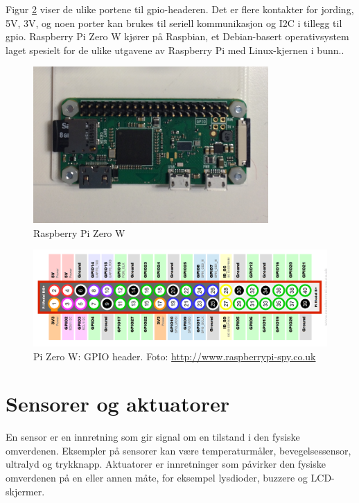Figur \ref{fig:pizero_gpio} viser de ulike portene til \gls{gpio}-headeren. Det er flere kontakter for
jording, 5V, 3V, og noen porter kan brukes til seriell kommunikasjon og I2C i tillegg til \gls{gpio}.
Raspberry Pi Zero W kjører på Raspbian, et Debian-basert operativsystem laget spesielt for de ulike utgavene av
Raspberry Pi med Linux-kjernen i bunn..

\begin{figure}
\includegraphics[width=0.8\textwidth,center]{fig/prototype/pi}
\caption{Raspberry Pi Zero W}
\label{fig:pizero}
\end{figure}

\begin{figure}
\includegraphics[width=1.0\textwidth,center]{fig/pizero_gpio}
\caption{Pi Zero W: GPIO header. Foto: \url{http://www.raspberrypi-spy.co.uk}}
\label{fig:pizero_gpio}
\end{figure}

\section{Sensorer og aktuatorer}
En sensor er en innretning som gir signal om en tilstand i den fysiske omverdenen. Eksempler
på sensorer kan være temperaturmåler, bevegelsessensor, ultralyd og trykknapp. Aktuatorer er innretninger som påvirker
den fysiske omverdenen på en eller annen måte, for eksempel lysdioder, buzzere og LCD-skjermer.

